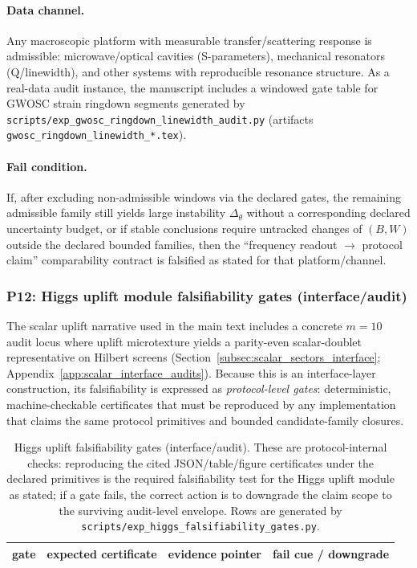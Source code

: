 \paragraph{Data channel.}
Any macroscopic platform with measurable transfer/scattering response is admissible:
microwave/optical cavities (S-parameters), mechanical resonators (Q/linewidth), and other systems with reproducible resonance structure.
As a real-data audit instance, the manuscript includes a windowed gate table for GWOSC strain ringdown segments generated by
\texttt{scripts/exp\_gwosc\_ringdown\_linewidth\_audit.py} (artifacts \texttt{gwosc\_ringdown\_linewidth\_*.tex}).

\paragraph{Fail condition.}
If, after excluding non-admissible windows via the declared gates, the remaining admissible family still yields large instability $\Delta_\theta$ without a corresponding declared uncertainty budget,
or if stable conclusions require untracked changes of $(B,W)$ outside the declared bounded families,
then the ``frequency readout $\rightarrow$ protocol claim'' comparability contract is falsified as stated for that platform/channel.

\subsubsection{P12: Higgs uplift module falsifiability gates (interface/audit)}
\label{subsec:p12_higgs_uplift_gates}

The scalar uplift narrative used in the main text includes a concrete $m=10$ audit locus where uplift microtexture yields a parity-even scalar-doublet representative on Hilbert screens (Section~\ref{subsec:scalar_sectors_interface}; Appendix~\ref{app:scalar_interface_audits}).
Because this is an interface-layer construction, its falsifiability is expressed as \emph{protocol-level gates}:
deterministic, machine-checkable certificates that must be reproduced by any implementation that claims the same protocol primitives and bounded candidate-family closures.
%

\begin{table}[t]
\centering
\scriptsize
\setlength{\tabcolsep}{6pt}
\renewcommand{\arraystretch}{1.15}
\begin{tabular}{p{1.1cm} p{3.8cm} p{3.6cm} p{3.6cm}}
\toprule
gate & expected certificate & evidence pointer & fail cue / downgrade \\
\midrule
%
\end{tabular}
\caption{Higgs uplift falsifiability gates (interface/audit). These are protocol-internal checks: reproducing the cited JSON/table/figure certificates under the declared primitives is the required falsifiability test for the Higgs uplift module as stated; if a gate fails, the correct action is to downgrade the claim scope to the surviving audit-level envelope. Rows are generated by \texttt{scripts/exp\_higgs\_falsifiability\_gates.py}.}
\label{tab:higgs_falsifiability_gates}
\end{table}


